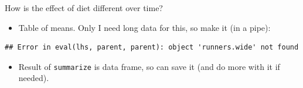 \documentclass[ignorenonframetext,]{beamer}
\newenvironment{Shaded}{\begin{snugshade}}{\end{snugshade}}
\newcommand{\DataTypeTok}[1]{\textcolor[rgb]{0.13,0.29,0.53}{#1}}
\newcommand{\KeywordTok}[1]{\textcolor[rgb]{0.13,0.29,0.53}{\textbf{#1}}}
\newcommand{\NormalTok}[1]{#1}
\newcommand{\OperatorTok}[1]{\textcolor[rgb]{0.81,0.36,0.00}{\textbf{#1}}}
\newcommand{\StringTok}[1]{\textcolor[rgb]{0.31,0.60,0.02}{#1}}
\providecommand{\tightlist}{%
  \setlength{\itemsep}{0pt}\setlength{\parskip}{0pt}}
\begin{document}
\begin{frame}[fragile]{How is the effect of diet different over time?}
\protect\hypertarget{how-is-the-effect-of-diet-different-over-time}{}

\begin{itemize}
\tightlist
\item
  Table of means. Only I need long data for this, so make it (in a
  pipe):
\end{itemize}

\begin{Shaded}
\end{Shaded}

\begin{verbatim}
## Error in eval(lhs, parent, parent): object 'runners.wide' not found
\end{verbatim}

\begin{itemize}
\tightlist
\item
  Result of \texttt{summarize} is data frame, so can save it (and do
  more with it if needed).
\end{itemize}

\end{frame}
\end{document}
